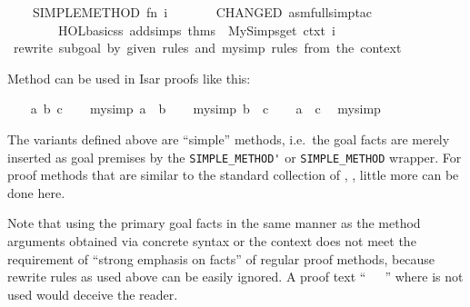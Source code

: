 \begin{isabellebody}
\ \ \ \ SIMPLE{\isacharunderscore}METHOD{\isacharprime}\ {\isacharparenleft}fn\ i\ {\isacharequal}{\isachargreater}\isanewline
\ \ \ \ \ \ CHANGED\ {\isacharparenleft}asm{\isacharunderscore}full{\isacharunderscore}simp{\isacharunderscore}tac\isanewline
\ \ \ \ \ \ \ \ {\isacharparenleft}HOL{\isacharunderscore}basic{\isacharunderscore}ss\ addsimps\ {\isacharparenleft}thms\ {\isacharat}\ My{\isacharunderscore}Simps{\isachardot}get\ ctxt{\isacharparenright}{\isacharparenright}\ i{\isacharparenright}{\isacharparenright}{\isacharparenright}\isanewline
{\isacharverbatimclose}\ {\isachardoublequoteopen}rewrite\ subgoal\ by\ given\ rules\ and\ my{\isacharunderscore}simp\ rules\ from\ the\ context{\isachardoublequoteclose}%
\endisatagML
{\isafoldML}%
%
\isadelimML
%
\endisadelimML
%
\begin{isamarkuptext}%
\medskip Method \hyperlink{method.my-simp'}{\mbox{}} can be used in Isar proofs
  like this:%
\end{isamarkuptext}%
\isamarkuptrue%
\isamarkupfalse%
\isanewline
%
\isadelimproof
\ \ %
\endisadelimproof
%
\isatagproof
{}\isamarkupfalse%
\ a\ b\ c\isanewline
\ \ \isamarkupfalse%
\ {\isacharbrackleft}my{\isacharunderscore}simp{\isacharbrackright}{\isacharcolon}\ {\isachardoublequoteopen}a\ {\isasymequiv}\ b{\isachardoublequoteclose}\isanewline
\ \ \isamarkupfalse%
\ {\isacharbrackleft}my{\isacharunderscore}simp{\isacharbrackright}{\isacharcolon}\ {\isachardoublequoteopen}b\ {\isasymequiv}\ c{\isachardoublequoteclose}\isanewline
\ \ \isamarkupfalse%
\ {\isachardoublequoteopen}a\ {\isasymequiv}\ c{\isachardoublequoteclose}\ \isamarkupfalse%
\ my{\isacharunderscore}simp{\isacharprime}\isanewline
{}\isamarkupfalse%
%
\endisatagproof
{\isafoldproof}%
%
\isadelimproof
%
\endisadelimproof
%
\begin{isamarkuptext}%
\medskip The \hyperlink{method.my-simp}{\mbox{}} variants defined above are
  ``simple'' methods, i.e.\ the goal facts are merely inserted as goal
  premises by the \verb|SIMPLE_METHOD'| or \verb|SIMPLE_METHOD| wrapper.
  For proof methods that are similar to the standard collection of
  \hyperlink{method.simp}{\mbox{}}, \hyperlink{method.blast}{\mbox{}}, \hyperlink{method.auto}{\mbox{}} little more can be
  done here.

  Note that using the primary goal facts in the same manner as the
  method arguments obtained via concrete syntax or the context does
  not meet the requirement of ``strong emphasis on facts'' of regular
  proof methods, because rewrite rules as used above can be easily
  ignored.  A proof text ``\hyperlink{command.using}{\mbox{}}~~\hyperlink{command.by}{\mbox{}}~'' where  is not used would
  deceive the reader.


\end{isamarkuptext}
\end{isabellebody}
